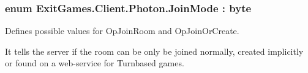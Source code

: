\subsubsection[{\texorpdfstring{Join\+Mode}{JoinMode}}]{\setlength{\rightskip}{0pt plus 5cm}enum {\bf Exit\+Games.\+Client.\+Photon.\+Join\+Mode} \+: byte\hspace{0.3cm}{\ttfamily [strong]}}\hypertarget{namespace_exit_games_1_1_client_1_1_photon_ad2643c9be9b35f92b9ed739fb77bc657}{}\label{namespace_exit_games_1_1_client_1_1_photon_ad2643c9be9b35f92b9ed739fb77bc657}


Defines possible values for Op\+Join\+Room and Op\+Join\+Or\+Create. 

It tells the server if the room can be only be joined normally, created implicitly or found on a web-\/service for Turnbased games.


